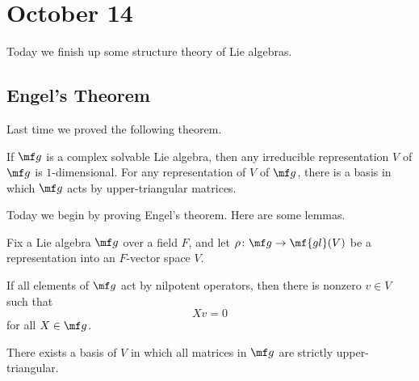 \documentclass[../notes.tex]{subfiles}
\begin{document}
\section{October 14}
Today we finish up some structure theory of Lie algebras.

\subsection{Engel's Theorem}
Last time we proved the following theorem.
\begin{theorem}[Lie] \label{thm:lie}
	If $\mf g$ is a complex solvable Lie algebra, then any irreducible representation $V$ of $\mf g$ is $1$-dimensional. For any representation of $V$ of $\mf g$, there is a basis in which $\mf g$ acts by upper-triangular matrices.
\end{theorem}
Today we begin by proving Engel's theorem. Here are some lemmas.
\begin{lemma}
	Fix a Lie algebra $\mf g$ over a field $F$, and let $\rho\colon\mf g\to\mf{gl}(V)$ be a representation into an $F$-vector space $V$.
	\begin{listalph}
		\item If all elements of $\mf g$ act by nilpotent operators, then there is nonzero $v\in V$ such that
		\[Xv=0\]
		for all $X\in\mf g$.
		\item There exists a basis of $V$ in which all matrices in $\mf g$ are strictly upper-triangular.
	\end{listalph}
\end{lemma}
\end{document}
